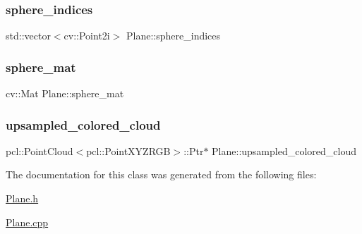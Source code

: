 \hypertarget{class_plane_a94247ab1ed3d194702250a3a98643212}{}\label{class_plane_a94247ab1ed3d194702250a3a98643212} 
\subsubsection{\texorpdfstring{sphere\+\_\+indices}{sphere\_indices}}
{\footnotesize\ttfamily std\+::vector$<$cv\+::\+Point2i$>$ Plane\+::sphere\+\_\+indices\hspace{0.3cm}{\ttfamily [private]}}

\hypertarget{class_plane_a1a9bdfcd38d9113a83ef12132570eff5}{}\label{class_plane_a1a9bdfcd38d9113a83ef12132570eff5} 
\subsubsection{\texorpdfstring{sphere\+\_\+mat}{sphere\_mat}}
{\footnotesize\ttfamily cv\+::\+Mat Plane\+::sphere\+\_\+mat\hspace{0.3cm}{\ttfamily [private]}}

\hypertarget{class_plane_a65a1a3e2e6eededc01baaa24b7bc7c6c}{}\label{class_plane_a65a1a3e2e6eededc01baaa24b7bc7c6c} 
\subsubsection{\texorpdfstring{upsampled\+\_\+colored\+\_\+cloud}{upsampled\_colored\_cloud}}
{\footnotesize\ttfamily pcl\+::\+Point\+Cloud$<$pcl\+::\+Point\+X\+Y\+Z\+R\+GB$>$\+::Ptr$\ast$ Plane\+::upsampled\+\_\+colored\+\_\+cloud\hspace{0.3cm}{\ttfamily [private]}}



The documentation for this class was generated from the following files\+:\begin{DoxyCompactItemize}
\item 
\hyperlink{_plane_8h}{Plane.\+h}\item 
\hyperlink{_plane_8cpp}{Plane.\+cpp}\end{DoxyCompactItemize}
